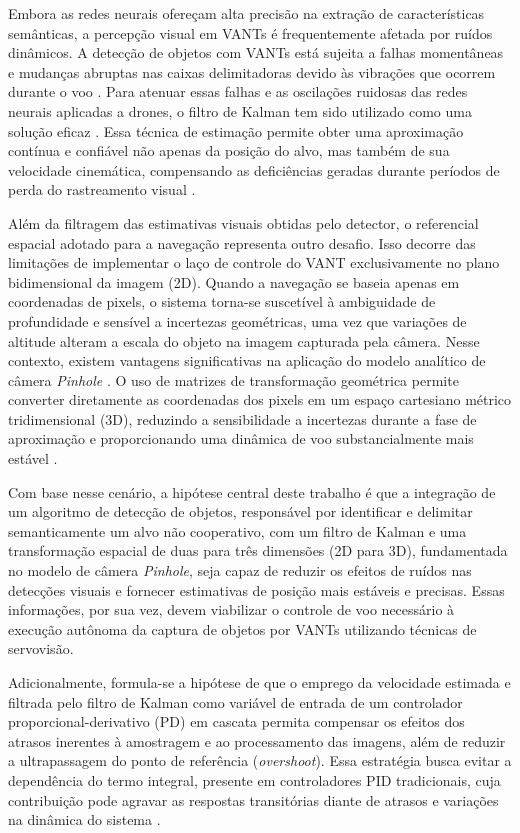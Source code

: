 Embora as redes neurais ofereçam alta precisão na extração de características semânticas, a percepção visual em VANTs é frequentemente afetada por ruídos dinâmicos. A detecção de objetos com VANTs está sujeita a falhas momentâneas e mudanças abruptas nas caixas delimitadoras devido às vibrações que ocorrem durante o voo \cite{barisic2019}. Para atenuar essas falhas e as oscilações ruidosas das redes neurais aplicadas a drones, o filtro de Kalman tem sido utilizado como uma solução eficaz \cite{barisic2019}. Essa técnica de estimação permite obter uma aproximação contínua e confiável não apenas da posição do alvo, mas também de sua velocidade cinemática, compensando as deficiências geradas durante períodos de perda do rastreamento visual \cite{barisic2019}.

Além da filtragem das estimativas visuais obtidas pelo detector, o referencial espacial adotado para a navegação representa outro desafio. Isso decorre das limitações de implementar o laço de controle do VANT exclusivamente no plano bidimensional da imagem (2D). Quando a navegação se baseia apenas em coordenadas de pixels, o sistema torna-se suscetível à ambiguidade de profundidade e sensível a incertezas geométricas, uma vez que variações de altitude alteram a escala do objeto na imagem capturada pela câmera. Nesse contexto, existem vantagens significativas na aplicação do modelo analítico de câmera \textit{Pinhole} \cite{thuilot2002, fagundes2025}. O uso de matrizes de transformação geométrica permite converter diretamente as coordenadas dos pixels em um espaço cartesiano métrico tridimensional (3D), reduzindo a sensibilidade a incertezas durante a fase de aproximação e proporcionando uma dinâmica de voo substancialmente mais estável \cite{fagundes2025}.

Com base nesse cenário, a hipótese central deste trabalho é que a integração de um algoritmo de detecção de objetos, responsável por identificar e delimitar semanticamente um alvo não cooperativo, com um filtro de Kalman e uma transformação espacial de duas para três dimensões (2D para 3D), fundamentada no modelo de câmera \textit{Pinhole}, seja capaz de reduzir os efeitos de ruídos nas detecções visuais e fornecer estimativas de posição mais estáveis e precisas. Essas informações, por sua vez, devem viabilizar o controle de voo necessário à execução autônoma da captura de objetos por VANTs utilizando técnicas de servovisão.

Adicionalmente, formula-se a hipótese de que o emprego da velocidade estimada e filtrada pelo filtro de Kalman como variável de entrada de um controlador proporcional-derivativo (PD) em cascata permita compensar os efeitos dos atrasos inerentes à amostragem e ao processamento das imagens, além de reduzir a ultrapassagem do ponto de referência (\textit{overshoot}). Essa estratégia busca evitar a dependência do termo integral, presente em controladores PID tradicionais, cuja contribuição pode agravar as respostas transitórias diante de atrasos e variações na dinâmica do sistema \cite{shang2016, jiang2021, fagundes2025}.

